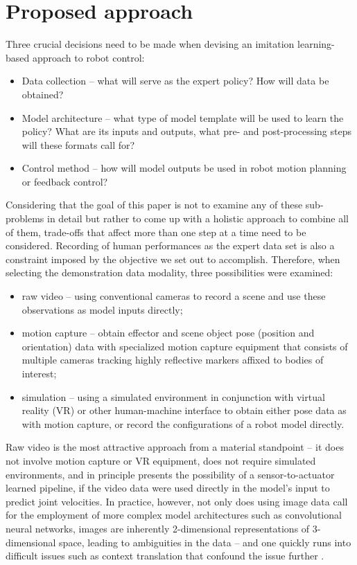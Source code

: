 \documentclass{article}
\begin{document}
\section{Proposed approach}
\label{sec:approach}

Three crucial decisions need to be made when devising an imitation learning-based approach to robot control:
\begin{itemize}
	\item Data collection -- what will serve as the expert policy? How will data be obtained?
	\item Model architecture -- what type of model template will be used to learn the policy? What are its inputs and outputs, what pre- and post-processing steps will these formats call for?
	\item Control method -- how will model outputs be used in robot motion planning or feedback control?
\end{itemize}

Considering that the goal of this paper is not to examine any of these sub-problems in detail but rather to come up with a holistic approach to combine all of them, trade-offs that affect more than one step at a time need to be considered. Recording of human performances as the expert data set is also a constraint imposed by the objective we set out to accomplish. Therefore, when selecting the demonstration data modality, three possibilities were examined:
\begin{itemize}
	\item raw video -- using conventional cameras to record a scene and use these observations as model inputs directly;
	\item motion capture -- obtain effector and scene object pose (position and orientation) data with specialized motion capture equipment that consists of multiple cameras tracking highly reflective markers affixed to bodies of interest;
	\item simulation -- using a simulated environment in conjunction with virtual reality (VR) or other human-machine interface to obtain either pose data as with motion capture, or record the configurations of a robot model directly. 
\end{itemize}

Raw video is the most attractive approach from a material standpoint -- it does not involve motion capture or VR equipment, does not require simulated environments, and in principle presents the possibility of a sensor-to-actuator learned pipeline, if the video data were used directly in the model's input to predict joint velocities. In practice, however, not only does using image data call for the employment of more complex model architectures such as convolutional neural networks, images are inherently 2-dimensional representations of 3-dimensional space, leading to ambiguities in the data -- and one quickly runs into difficult issues such as context translation that confound the issue further \citep{liu2018imitation}. 
\end{document}
